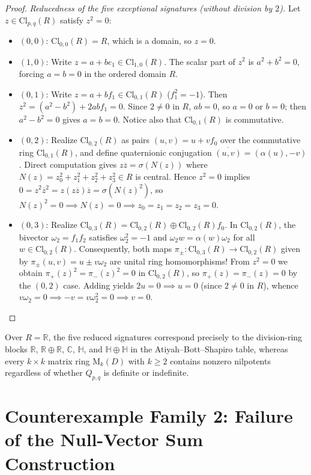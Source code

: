 \documentclass[11pt]{article}
\theoremstyle{definition}
\newcommand{\Cl}{\mathrm{Cl}}
\newcommand{\Mat}{\mathrm{M}}
\newcommand{\R}{\mathbb{R}}
\newcommand{\C}{\mathbb{C}}
\newcommand{\HH}{\mathbb{H}}
\begin{document}
\begin{proof}
\smallskip
\noindent\emph{Reducedness of the five exceptional signatures (without division by $2$).}
Let $z \in \Cl_{p,q}(R)$ satisfy $z^2 = 0$:
\begin{itemize}
  \item $(0, 0)$: $\Cl_{0,0}(R) = R$, which is a domain, so $z = 0$.
  \item $(1, 0)$: Write $z = a + b e_1 \in \Cl_{1,0}(R)$. The scalar part of $z^2$ is
    $a^2 + b^2 = 0$, forcing $a = b = 0$ in the ordered domain $R$.
  \item $(0, 1)$: Write $z = a + b f_1 \in \Cl_{0,1}(R)$ ($f_1^2 = -1$). Then
    $z^2 = (a^2 - b^2) + 2 a b f_1 = 0$. Since $2 \ne 0$ in $R$, $ab = 0$, so $a = 0$ or
    $b = 0$; then $a^2 - b^2 = 0$ gives $a = b = 0$. Notice also that $\Cl_{0,1}(R)$ is
    commutative.
  \item $(0, 2)$: Realize $\Cl_{0,2}(R)$ as pairs $(u, v) = u + v f_0$ over the
    commutative ring $\Cl_{0,1}(R)$, and define quaternionic conjugation
    $\overline{(u, v)} = (\alpha(u), -v)$. Direct computation gives
    $z \overline{z} = \sigma(N(z))$ where $N(z) = z_0^2 + z_1^2 + z_2^2 + z_3^2 \in R$
    is central. Hence $z^2 = 0$ implies
    $0 = z^2 \overline{z}^2 = z(z\overline{z})\overline{z} = \sigma(N(z)^2)$, so
    $N(z)^2 = 0 \implies N(z) = 0 \implies z_0 = z_1 = z_2 = z_3 = 0$.
  \item $(0, 3)$: Realize $\Cl_{0,3}(R) = \Cl_{0,2}(R) \oplus \Cl_{0,2}(R) f_0$. In
    $\Cl_{0,2}(R)$, the bivector $\omega_2 = f_1 f_2$ satisfies $\omega_2^2 = -1$ and
    $\omega_2 w = \alpha(w)\omega_2$ for all $w \in \Cl_{0,2}(R)$. Consequently, both maps
    $\pi_\pm : \Cl_{0,3}(R) \to \Cl_{0,2}(R)$ given by $\pi_\pm(u, v) = u \pm v \omega_2$
    are unital ring homomorphisms! From $z^2 = 0$ we obtain $\pi_+(z)^2 = \pi_-(z)^2 = 0$
    in $\Cl_{0,2}(R)$, so $\pi_+(z) = \pi_-(z) = 0$ by the $(0, 2)$ case. Adding yields
    $2 u = 0 \implies u = 0$ (since $2 \ne 0$ in $R$), whence $v \omega_2 = 0 \implies
    -v = v \omega_2^2 = 0 \implies v = 0$. \qedhere
\end{itemize}
\end{proof}

Over $R = \R$, the five reduced signatures correspond precisely to the division-ring
blocks $\R$, $\R \oplus \R$, $\C$, $\HH$, and $\HH \oplus \HH$ in the Atiyah--Bott--Shapiro
table, whereas every $k \times k$ matrix ring $\Mat_k(D)$ with $k \ge 2$ contains nonzero
nilpotents regardless of whether $Q_{p,q}$ is definite or indefinite.

\section{Counterexample Family 2: Failure of the Null-Vector Sum Construction}
\end{document}
